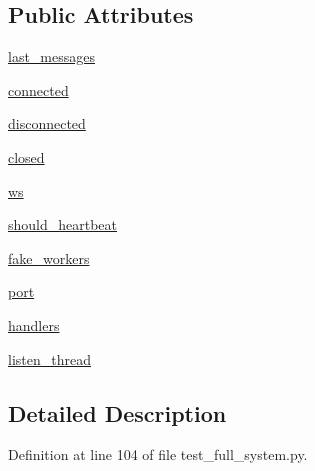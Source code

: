 \subsection*{Public Attributes}
\begin{DoxyCompactItemize}
\item 
\hyperlink{classparlai_1_1mturk_1_1core_1_1test_1_1test__full__system_1_1MockSocket_abd62d703006a741f11922e621fd033be}{last\+\_\+messages}
\item 
\hyperlink{classparlai_1_1mturk_1_1core_1_1test_1_1test__full__system_1_1MockSocket_a1c69f2c0e85a567360d38ce105ae47a4}{connected}
\item 
\hyperlink{classparlai_1_1mturk_1_1core_1_1test_1_1test__full__system_1_1MockSocket_a25815cbde935f14c08c707295ef2eb48}{disconnected}
\item 
\hyperlink{classparlai_1_1mturk_1_1core_1_1test_1_1test__full__system_1_1MockSocket_abc6460e0ba4ef0c849408f4403206a1d}{closed}
\item 
\hyperlink{classparlai_1_1mturk_1_1core_1_1test_1_1test__full__system_1_1MockSocket_a954ed7f85a85a36db6ce598d5e633aea}{ws}
\item 
\hyperlink{classparlai_1_1mturk_1_1core_1_1test_1_1test__full__system_1_1MockSocket_ad4ae87c752baa26a3f038ef538be1160}{should\+\_\+heartbeat}
\item 
\hyperlink{classparlai_1_1mturk_1_1core_1_1test_1_1test__full__system_1_1MockSocket_a7dd45e7577339ded43b4056cfc33bf59}{fake\+\_\+workers}
\item 
\hyperlink{classparlai_1_1mturk_1_1core_1_1test_1_1test__full__system_1_1MockSocket_a33c2ad664fadff34fcba9ede312be2cd}{port}
\item 
\hyperlink{classparlai_1_1mturk_1_1core_1_1test_1_1test__full__system_1_1MockSocket_a8226251517330cc176d7155983a26d3a}{handlers}
\item 
\hyperlink{classparlai_1_1mturk_1_1core_1_1test_1_1test__full__system_1_1MockSocket_a21da0874111057953c5fc18d802aa57e}{listen\+\_\+thread}
\end{DoxyCompactItemize}


\subsection{Detailed Description}


Definition at line 104 of file test\+\_\+full\+\_\+system.\+py.




